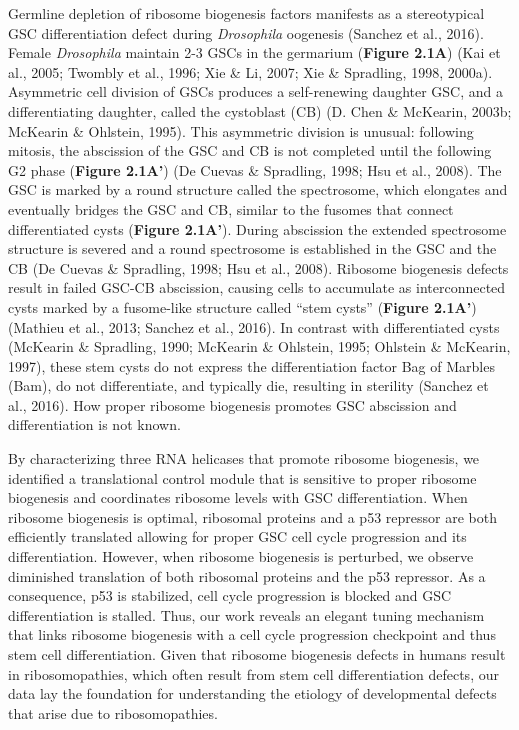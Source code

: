 \documentclass[12pt,twoside]{reedthesis}
\begin{document}
Germline depletion of ribosome biogenesis factors manifests as a
stereotypical GSC differentiation defect during \emph{Drosophila} oogenesis
(Sanchez et al., 2016). Female \emph{Drosophila} maintain 2-3 GSCs in the
germarium (\textbf{Figure 2.1A}) (Kai et al., 2005; Twombly et al., 1996; Xie \& Li, 2007; Xie \& Spradling, 1998, 2000a). Asymmetric cell division of GSCs produces a
self-renewing daughter GSC, and a differentiating daughter, called the
cystoblast (CB) (D. Chen \& McKearin, 2003b; McKearin \& Ohlstein, 1995). This asymmetric
division is unusual: following mitosis, the abscission of the GSC and CB
is not completed until the following G2 phase (\textbf{Figure 2.1A'})
(De Cuevas \& Spradling, 1998; Hsu et al., 2008). The GSC is marked by a
round structure called the spectrosome, which elongates and eventually
bridges the GSC and CB, similar to the fusomes that connect
differentiated cysts (\textbf{Figure 2.1A'}). During abscission the extended
spectrosome structure is severed and a round spectrosome is established
in the GSC and the CB (De Cuevas \& Spradling, 1998; Hsu et al., 2008).
Ribosome biogenesis defects result in failed GSC-CB abscission, causing
cells to accumulate as interconnected cysts marked by a fusome-like
structure called ``stem cysts'' (\textbf{Figure 2.1A'}) (Mathieu et al., 2013; Sanchez et al., 2016). In contrast with differentiated cysts
(McKearin \& Spradling, 1990; McKearin \& Ohlstein, 1995; Ohlstein \& McKearin, 1997), these stem cysts do not
express the differentiation factor Bag of Marbles (Bam), do not
differentiate, and typically die, resulting in sterility
(Sanchez et al., 2016). How proper ribosome biogenesis promotes GSC
abscission and differentiation is not known.

By characterizing three RNA helicases that promote ribosome biogenesis,
we identified a translational control module that is sensitive to proper
ribosome biogenesis and coordinates ribosome levels with GSC
differentiation. When ribosome biogenesis is optimal, ribosomal proteins
and a p53 repressor are both efficiently translated allowing for proper
GSC cell cycle progression and its differentiation. However, when
ribosome biogenesis is perturbed, we observe diminished translation of
both ribosomal proteins and the p53 repressor. As a consequence, p53 is
stabilized, cell cycle progression is blocked and GSC differentiation is
stalled. Thus, our work reveals an elegant tuning mechanism that links
ribosome biogenesis with a cell cycle progression checkpoint and thus
stem cell differentiation. Given that ribosome biogenesis defects in
humans result in ribosomopathies, which often result from stem cell
differentiation defects, our data lay the foundation for understanding
the etiology of developmental defects that arise due to ribosomopathies.
\end{document}
